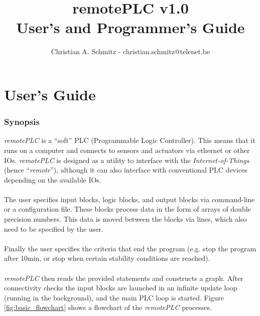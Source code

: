 \documentclass[a4paper]{article}
\title{remotePLC v1.0\\User's and Programmer's Guide}
\author{Christian A. Schmitz - christian.schmitz@telenet.be}
\begin{document}
\maketitle
\newpage
\tableofcontents
\newpage
\part{User's Guide}
\section{Synopsis}
\textit{remotePLC} is a ``soft'' PLC (Programmable Logic Controller). This means that it runs on a computer and connects to sensors and actuators via ethernet or other IOs. \textit{remotePLC} is designed as a utility to interface with the \textit{Internet-of-Things} (hence ``\textit{remote}''), although it can also interface with conventional PLC devices depending on the available IOs.\\\\
The user specifies input blocks, logic blocks, and output blocks via command-line or a configuration file. These blocks process data in the form of arrays of double precision numbers. This data is moved between the blocks via lines, which also need to be specified by the user.\\\\
Finally the user specifies the criteria that end the program (e.g. stop the program after 10min, or stop when certain stability conditions are reached).\\\\
\textit{remotePLC} then reads the provided statements and constructs a graph. After connectivity checks the input blocks are launched in an infinite update loop (running in the background), and the main PLC loop is started. Figure \ref{fig:basic_flowchart} shows a flowchart of the \textit{remotePLC} processes.
\end{document}
